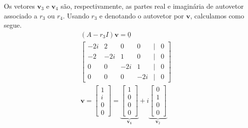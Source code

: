 \begin{resol}
\begin{enumerate}[a)]
    Os vetores $\pmb{v}_3$ e $\pmb{v}_4$ são, respectivamente, as partes real e imaginária de autovetor associado a $r_3$ ou $r_4$. Usando $r_3$ e denotando o autovetor por $\pmb{v}$, calculamos como segue.
    \begin{gather}
      (A-r_3I)\pmb{v} = \underline{0} \\
      \begin{bmatrix}
        -2i & 2 & 0 & 0 & | & 0 \\
        -2 & -2i & 1 & 0 & | & 0 \\
        0 & 0 & -2i & 1 & | & 0 \\
        0 & 0 & 0 & -2i & | & 0
      \end{bmatrix}\\
      \pmb{v} =
      \begin{bmatrix}
        1 \\
        i \\
        0 \\
        0
      \end{bmatrix} =
      \underbrace{\begin{bmatrix}
          1 \\
          0 \\
          0 \\
          0
      \end{bmatrix}}_{\pmb{v_1}} + i
      \underbrace{\begin{bmatrix}
          0 \\
          1 \\
          0 \\
          0
      \end{bmatrix}}_{\pmb{v}_2}
    \end{gather}
  \end{enumerate}


\end{resol}

